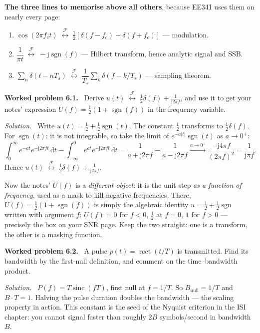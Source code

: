 \documentclass[11pt,a4paper]{article}
\newcommand{\FT}{\;\stackrel{\mathcal{F}}{\longleftrightarrow}\;}
\newcommand{\sinc}{\operatorname{sinc}}
\newcommand{\rect}{\operatorname{rect}}
\newcommand{\sgn}{\operatorname{sgn}}
\newcommand{\dd}{\,\mathrm{d}}
\newcommand{\ii}{\mathrm{j}}
\newenvironment{worked}[1]{\par\vspace{4pt}\noindent\textbf{\color{warmred}Worked problem #1.}\ \ignorespaces}{\par\vspace{4pt}}
\newcommand{\soln}{\par\vspace{2pt}\noindent\textit{Solution.}\ \ignorespaces}
\begin{document}
\begin{keybox}
\textbf{The three lines to memorise above all others}, because EE341 uses them on nearly every page:
\begin{enumerate}[nosep,leftmargin=*]
\item $\cos(2\pi f_ct)\FT\tfrac12[\delta(f-f_c)+\delta(f+f_c)]$ --- modulation.
\item $\dfrac{1}{\pi t}\FT-\ii\sgn(f)$ --- Hilbert transform, hence analytic signal and SSB.
\item $\sum_n\delta(t-nT_s)\FT \dfrac{1}{T_s}\sum_k\delta(f-k/T_s)$ --- sampling theorem.
\end{enumerate}
\end{keybox}

\begin{worked}{6.1}
Derive $u(t)\FT\frac12\delta(f)+\frac{1}{\ii2\pi f}$, and use it to get your notes' expression
$U(f)=\frac12(1+\sgn(f))$ in the frequency variable.
\end{worked}
\soln
Write $u(t)=\frac12+\frac12\sgn(t)$. The constant $\frac12$ transforms to $\frac12\delta(f)$.
For $\sgn(t)$: it is not integrable, so take the limit of $e^{-a|t|}\sgn(t)$ as $a\to0^+$:
\[
\int_0^\infty e^{-at}e^{-\ii2\pi ft}\dd t-\int_{-\infty}^0 e^{at}e^{-\ii2\pi ft}\dd t
=\frac{1}{a+\ii2\pi f}-\frac{1}{a-\ii2\pi f}\xrightarrow{a\to0^+}\frac{-\ii4\pi f}{(2\pi f)^2}=\frac{1}{\ii\pi f}.
\]
Hence $u(t)\FT\frac12\delta(f)+\frac{1}{\ii2\pi f}$.

Now the notes' $U(f)$ is a \emph{different object}: it is the unit step \emph{as a function of frequency},
used as a mask to kill negative frequencies. There, $U(f)=\frac12(1+\sgn(f))$ is simply the algebraic identity
$u=\frac12+\frac12\sgn$ written with argument $f$: $U(f)=0$ for $f<0$, $\frac12$ at $f=0$, $1$ for $f>0$ ---
precisely the box on your SNR page. Keep the two straight: one is a transform, the other is a masking
function.

\begin{worked}{6.2}
A pulse $p(t)=\rect(t/T)$ is transmitted. Find its bandwidth by the first-null definition, and comment on the
time--bandwidth product.
\end{worked}
\soln
$P(f)=T\sinc(fT)$, first null at $f=1/T$. So $B_{\text{null}}=1/T$ and $B\cdot T=1$. Halving the pulse
duration doubles the bandwidth --- the scaling property in action. This constant is the seed of the Nyquist
criterion in the ISI chapter: you cannot signal faster than roughly $2B$ symbols/second in bandwidth $B$.
\end{document}

